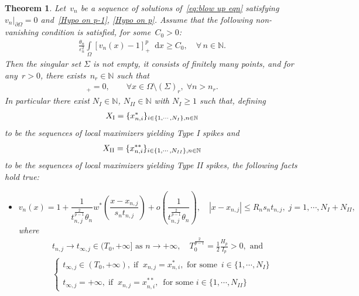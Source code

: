 \documentclass[10pt]{amsart}
\newcommand{\dd}{\mathop{}\!\mathrm{d}}
\newcommand{\eps}{\varepsilon}
\newcommand{\p}{\partial}
\def\N{\mathbb{N}}
\renewcommand{\to}{\rightarrow}
\newcommand{\ii}{\infty}
\newtheorem{theorem}{Theorem}[section]
\newcommand{\graf}[1]{\left\{\begin{array}{ll}#1\end{array}\right.}
\begin{document}
    \begin{theorem}\label{thm:ALT many maximum}
        Let~$v_n$ be a sequence of solutions of~\eqref{eq:blow up eqn} satisfying $v_n|_{\p\Omega}=0$ and~\eqref{Hypo on p-1},
        \eqref{Hypo on p}. Assume that the following non-vanishing condition is satisfied, for some~$C_0>0$:
                \begin{align}\label{eq:NV p}\tag{\bf NV$_p$}
                    \frac{\theta_n}{\eps_n^2}\int\limits_{\Omega} [v_n(x)-1]_+^p\dd{x}\geq C_0,\quad \forall\,n\in\N.
                \end{align}
        Then the singular set $\Sigma$ is not empty, it consists of finitely many points, and for any~$r>0$, there exists~$n_r\in\mathbb{N}$ such that
        \begin{align*}
            [v_n(x)-1]_+ =0, \qquad \forall x\in \Omega\setminus (\Sigma)_r, \; \forall n > n_r.
        \end{align*}
        In particular there exist $N_I\in\N$, $N_{II}\in\N$ with $N_{I}\geq 1$ such that, defining
        \begin{align}
         X_{\rm I}=\{x^*_{n,i}\}_{i\in\{1,\cdots,N_I\}, n\in\N}
        \end{align}
        to be the sequences of local maximizers yielding Type I spikes and
        \begin{align}
         X_{\rm II}=\{x^{**}_{n,i}\}_{i\in\{1,\cdots,N_{II}\},n\in\N}
        \end{align}
        to be the sequences of local maximizers yielding Type II spikes, the following
        facts hold true:
         \begin{itemize}
            \item[(a)]
     $$
     v_n(x)= 1+\frac{1}{t_{n,j}^{\frac{2}{p-1}}\theta_n} w^*(\frac{x-x_{n,j}}{s_n t_{n,j}})+ o(\frac{1}{t_{n,j}^{\frac{2}{p-1}}\theta_n }),
     \quad |x-x_{n,j}|\leq R_{n}s_nt_{n,j},\;j=1,\cdots,N_I+N_{II},
     $$
 where
     \begin{align*}
    & t_{n,j}\to t_{\ii,j}\in (T_0,+\ii] \mbox{ as }n\to+\infty,\quad  T_0^{\frac{2}{p-1}}=\frac{1}{2}\frac{H_p}{I_p}>0, \mbox{ and }\\
    & \graf{t_{\ii,j}\in (T_0,+\ii), \;\mbox{if}\;\; x_{n,j}=x^*_{n,i},\mbox{ for some }\,i\in \{1,\cdots,N_{I}\}\\\,\\
     t_{\ii,j}=+\ii, \;\mbox{if}\;\; x_{n,j}=x^{**}_{n,i},\,\mbox{ for some }i\in \{1,\cdots,N_{II}\}}
      \end{align*}

\end{itemize}
\end{theorem}
\end{document}
